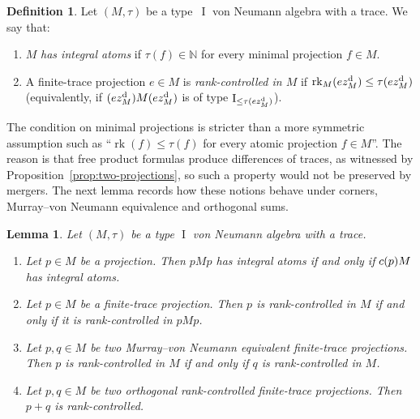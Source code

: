 \documentclass[11pt]{amsart}
\makeatletter
\numberwithin{equation}{section}
\newcommand{\nn}{\mathbb N}
\DeclareMathOperator{\I}{I}
\DeclareMathOperator{\rk}{rk}
\newcommand{\@optsub}[1]{\if\relax\detokenize{#1}\relax\else_{#1}\fi}
\newcommand{\csupp}[2][]{c\@optsub{#1}(#2)}
\newcommand{\zdiff}[1][]{z^{\mathrm{d}}\@optsub{#1}}
\newtheorem{Lem}[The]{Lemma}
\theoremstyle{definition}
\newtheorem{Def}[The]{Definition}
\makeatother
\begin{document}
\begin{Def}
    \label{def:integral-atoms}
    Let $(M,\tau)$ be a type~$\I$ von Neumann algebra with a trace. We say that: 
    \begin{enumerate}[\rm (i)]
        \item\label{it:integral-atoms} $M$ \emph{has integral atoms} if $\tau(f)\in\nn$ for every minimal projection $f\in M$.
        \item\label{it:rank-controlled} A finite-trace projection $e\in M$ is \emph{rank-controlled in $M$} if $\rk_M(e\zdiff[M])\leq\tau(e\zdiff[M])$ (equivalently, if $(e\zdiff[M])M(e\zdiff[M])$ is of type $\I_{\leq\tau(e\zdiff[M])}$).
    \end{enumerate}
\end{Def}

The condition on minimal projections is stricter than a more symmetric assumption such as ``$\rk(f)\leq\tau(f)$ for every atomic projection $f\in M$''. The reason is that free product formulas produce differences of traces, as witnessed by Proposition~\ref{prop:two-projections}, so such a property would not be preserved by mergers. The next lemma records how these notions behave under corners, Murray--von Neumann equivalence and orthogonal sums. 

\begin{Lem}
    \label{lem:rank-control-properties}
    Let $(M,\tau)$ be a type $\I$ von Neumann algebra with a trace. 
    \begin{enumerate}[\rm (i)]
        \item\label{it:integral-atoms-corners} Let $p\in M$ be a projection. Then $pMp$ has integral atoms if and only if $\csupp{p}M$ has integral atoms.
        \item\label{it:rank-control-corners} Let $p\in M$ be a finite-trace projection. Then $p$ is rank-controlled in $M$ if and only if it is rank-controlled in $pMp$.
        \item\label{it:rank-control-equivalence} Let $p,q\in M$ be two Murray--von Neumann equivalent finite-trace projections. Then $p$ is rank-controlled in $M$ if and only if $q$ is rank-controlled in $M$. 
        \item\label{it:rank-control-sums}  Let $p,q\in M$ be two orthogonal rank-controlled finite-trace projections. Then $p+q$ is rank-controlled.
    \end{enumerate}
\end{Lem}
\end{document}
